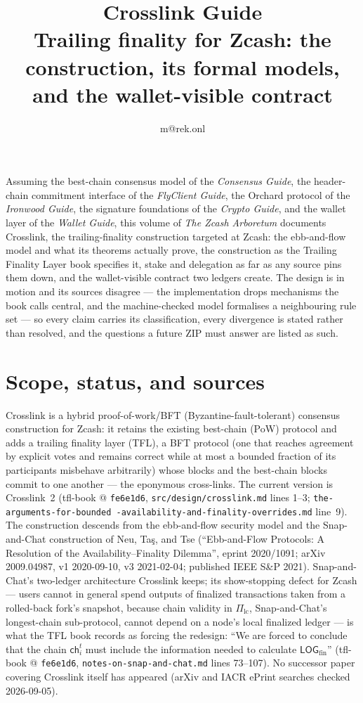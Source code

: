 \documentclass[11pt,a4paper]{article}
\title{\textbf{\Huge Crosslink Guide}\\[6pt]\large Trailing finality for Zcash: the construction, its formal models, and the wallet-visible contract}
\author{m@rek.onl}
\date{}
\theoremstyle{definition}
\renewenvironment{abstract}{%
  \small\begin{center}{\bfseries\abstractname}\end{center}\medskip\noindent\ignorespaces
}{\par\medskip}
\begin{document}
\maketitle
\thispagestyle{empty}
\begin{abstract}
Assuming the best-chain consensus model of the \emph{Consensus Guide}, the
header-chain commitment interface of the \emph{FlyClient Guide}, the Orchard
protocol of the \emph{Ironwood Guide}, the signature foundations of the
\emph{Crypto Guide}, and the wallet layer of the \emph{Wallet Guide}, this
volume of \emph{The Zcash Arboretum} documents Crosslink, the trailing-finality
construction targeted at Zcash: the ebb-and-flow model and what its theorems
actually prove, the construction as the Trailing Finality Layer book specifies
it, stake and delegation as far as any source pins them down, and the
wallet-visible contract two ledgers create.
The design is in motion and its sources disagree --- the
implementation drops mechanisms the book calls central, and the
machine-checked model formalises a neighbouring rule set --- so every claim
carries its classification, every divergence is stated rather than resolved,
and the questions a future ZIP must answer are listed as such.
\end{abstract}
\clearpage
\tableofcontents
\clearpage
\section{Scope, status, and sources}\label{sec:xl-scope}

Crosslink is a hybrid proof-of-work/BFT (Byzantine-fault-tolerant)
consensus construction for Zcash: it retains the existing best-chain
(PoW) protocol and adds a trailing finality layer (TFL), a BFT protocol
(one that reaches agreement by explicit votes and remains correct while
at most a bounded fraction of its participants misbehave arbitrarily)
whose blocks and the best-chain blocks commit to one another --- the
eponymous cross-links. The current
version is Crosslink~2 (tfl-book @ \texttt{fe6e1d6},
\texttt{src/\allowbreak design/\allowbreak crosslink.md} lines 1--3;
\texttt{the-arguments\allowbreak-for\allowbreak-bounded\allowbreak
-availability\allowbreak-and\allowbreak-finality\allowbreak-overrides.md}
line~9). The construction descends from the ebb-and-flow security model
and the Snap-and-Chat construction of Neu, Ta\c{s}, and Tse
(``Ebb-and-Flow Protocols: A Resolution of the Availability--Finality
Dilemma'', eprint 2020/1091; arXiv 2009.04987, v1 2020-09-10, v3
2021-02-04; published IEEE S\&P 2021). Snap-and-Chat's two-ledger
architecture Crosslink keeps; its show-stopping defect for Zcash ---
users cannot in general spend outputs of finalized transactions taken
from a rolled-back fork's snapshot, because chain validity in
$\Pi_{\mathrm{lc}}$, Snap-and-Chat's longest-chain sub-protocol,
cannot depend on a node's local finalized ledger
--- is what the TFL book records as forcing the redesign: ``We are
forced to conclude that the chain $\mathsf{ch}_i^t$ must include the
information needed to calculate $\mathsf{LOG}_{\mathrm{fin}}$''
(tfl-book @ \texttt{fe6e1d6}, \texttt{notes-on-snap-and-chat.md} lines
73--107). No successor paper covering Crosslink itself has appeared
(arXiv and IACR ePrint searches checked 2026-09-05).
\end{document}
